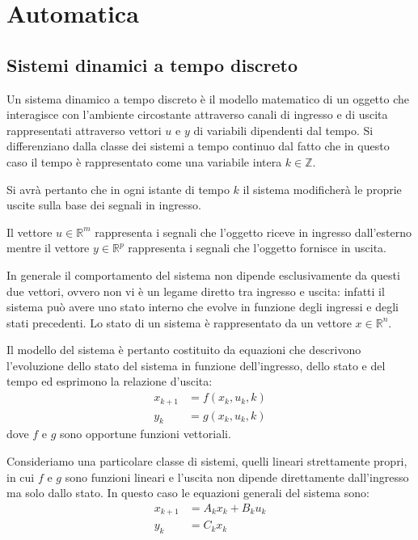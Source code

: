\section{Automatica}
\subsection{Sistemi dinamici a tempo discreto}

Un sistema dinamico a tempo discreto è il modello matematico di un oggetto che interagisce con l’ambiente circostante attraverso canali di ingresso e di uscita rappresentati attraverso vettori $u$ e $y$ di variabili dipendenti dal tempo. Si differenziano dalla classe dei sistemi a tempo continuo dal fatto che in questo caso il tempo è rappresentato come una variabile intera $k \in \mathbb{Z}$.

Si avrà pertanto che in ogni istante di tempo $k$ il sistema modificherà le proprie uscite sulla base dei segnali in ingresso.

Il vettore $u \in \mathbb{R}^m$ rappresenta i segnali che l’oggetto riceve in ingresso dall’esterno mentre il vettore $y \in \mathbb{R}^p$ rappresenta i segnali che l’oggetto fornisce in uscita.

In generale il comportamento del sistema non dipende esclusivamente da questi due vettori, ovvero non vi è un legame diretto tra ingresso e uscita: infatti il sistema può avere uno stato interno che evolve in funzione degli ingressi e degli stati precedenti. Lo stato di un sistema è rappresentato da un vettore $x \in \mathbb{R}^n$.

Il modello del sistema è pertanto costituito da equazioni che descrivono l’evoluzione dello stato del sistema in funzione dell’ingresso, dello stato e del tempo ed esprimono la relazione d'uscita:
\begin{subequations}
\begin{align}
x_{k+1} &= f(x_k,u_k,k) \\
y_k &= g(x_k,u_k,k)
\end{align}
\end{subequations}
dove $f$ e $g$ sono opportune funzioni vettoriali.



Consideriamo una particolare classe di sistemi, quelli lineari strettamente propri, in cui $f$ e $g$ sono funzioni lineari e l’uscita non dipende direttamente dall’ingresso ma solo dallo stato. In questo caso le equazioni generali del sistema sono:
\begin{subequations}
\begin{align}
\label{eqstate}
x_{k+1} &= A_kx_k + B_ku_k \\
y_k &= C_kx_k
\end{align}
\end{subequations}


